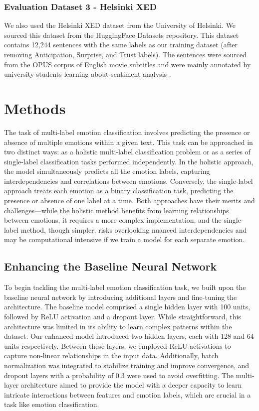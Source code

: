\documentclass[11pt]{article}
\begin{document}
\subsubsection{Evaluation Dataset 3 - Helsinki XED}

We also used the Helsinki XED dataset from the University of Helsinki. We sourced this dataset from the HuggingFace Datasets repository. This dataset contains 12,244 sentences with the same labels as our training dataset (after removing Anticipation, Surprise, and Trust labels). The sentences were sourced from the OPUS corpus of English movie subtitles and were mainly annotated by university students learning about sentiment analysis \cite{ohman-etal-2020-xed}.


\section{Methods}

The task of multi-label emotion classification involves predicting the presence or absence of multiple emotions within a given text. This task can be approached in two distinct ways: as a holistic multi-label classification problem or as a series of single-label classification tasks performed independently. In the holistic approach, the model simultaneously predicts all the emotion labels, capturing interdependencies and correlations between emotions. Conversely, the single-label approach treats each emotion as a binary classification task, predicting the presence or absence of one label at a time. Both approaches have their merits and challenges—while the holistic method benefits from learning relationships between emotions, it requires a more complex implementation, and the single-label method, though simpler, risks overlooking nuanced interdependencies and may be computational intensive if we train a model for each separate emotion. 

\subsection{Enhancing the Baseline Neural Network}

To begin tackling the multi-label emotion classification task, we built upon the baseline neural network by introducing additional layers and fine-tuning the architecture. The baseline model comprised a single hidden layer with 100 units, followed by ReLU activation and a dropout layer. While straightforward, this architecture was limited in its ability to learn complex patterns within the dataset.
Our enhanced model introduced two hidden layers, each with 128 and 64 units respectively. Between these layers, we employed ReLU activations to capture non-linear relationships in the input data. Additionally, batch normalization was integrated to stabilize training and improve convergence, and dropout layers with a probability of 0.3 were used to avoid overfitting. The multi-layer architecture aimed to provide the model with a deeper capacity to learn intricate interactions between features and emotion labels, which are crucial in a task like emotion classification.
\end{document}

